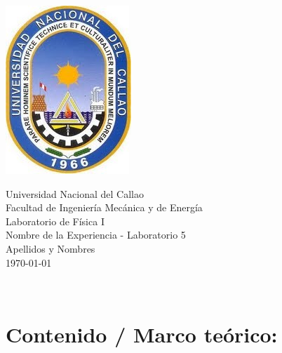 \documentclass[10pt,a4paper]{article}
\newcommand{\myUniversidad}{Universidad Nacional del Callao}
\newcommand{\myFacultad}{Facultad de Ingenier\'ia Mec\'anica y de Energ\'ia}
\newcommand{\myCurso}{Laboratorio de F\'isica I}
\newcommand{\myTarea }{Nombre de la Experiencia - Laboratorio }
\newcommand{\myNombre}{Apellidos y Nombres}
\newcommand{\myNumTarea}{5} %
\begin{document}
\thispagestyle{plain} %
\begin{minipage}{.30\textwidth}
 \includegraphics[width=.5\textwidth]{Escudo_UNAC.png}\\[.5cm]
\end{minipage}
\begin{minipage}{.65\textwidth}
\begin{center} 
\Large{                
\myUniversidad\\
\myFacultad\\ 
\myCurso\\
{\myTarea \myNumTarea}\\
\myNombre\\
\today}
\end{center} 
\end{minipage}\\
\centerline{\underline{\hspace{7in}}}
\tableofcontents


\section{Contenido / Marco teórico:} 
\end{document}
